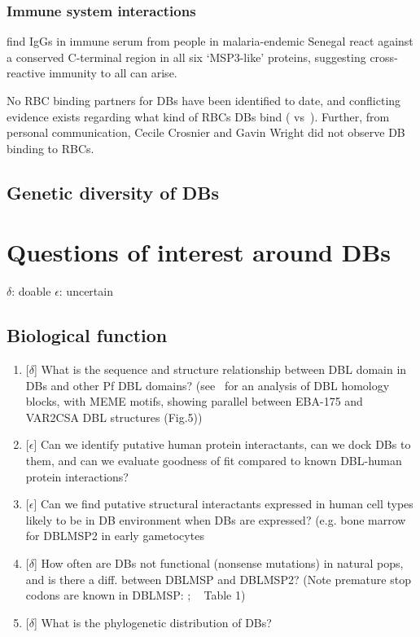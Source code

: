 \documentclass[12pt]{article}
\begin{document}
\subsubsection{Immune system interactions}

\cite{singh_conserved_2009} find IgGs in immune serum from people in malaria-endemic Senegal react against a
conserved C-terminal region in all six `MSP3-like' proteins, suggesting cross-reactive immunity to
all can arise.

No RBC binding partners for DBs have been identified to date, and conflicting evidence
exists regarding what kind of RBCs DBs bind (\cite{wickramarachchi_novel_2009} vs~\cite{Hodder2012}).
Further, from personal communication, Cecile Crosnier and Gavin Wright did not observe DB binding
to RBCs.

\subsection{Genetic diversity of DBs}


\clearpage

\section{Questions of interest around DBs}
$\delta$: doable
$\epsilon$: uncertain

\subsection{Biological function}
\begin{enumerate}
    \item{[$\delta$] What is the sequence and structure relationship between DBL domain in DBs and other Pf DBL domains?
        (see~\cite{Rask2010} for an analysis of DBL homology blocks, with MEME motifs,
        showing parallel between EBA-175 and VAR2CSA DBL structures (Fig.5))
        }
    \item{[$\epsilon$] Can we identify putative human protein interactants, can we dock
        DBs to them, and can we evaluate goodness of fit compared to known DBL-human
        protein interactions?}
    \item{[$\epsilon$] Can we find putative structural interactants expressed in human
        cell types likely to be in DB environment when DBs are expressed? (e.g. bone
        marrow for DBLMSP2 in early gametocytes}
    \item{[$\delta$] How often are DBs not functional (nonsense mutations) in natural
        pops, and is there a diff. between DBLMSP and DBLMSP2? (Note 
        premature stop codons are known in DBLMSP: \cite{Tetteh2009};
        ~\cite{ochola_allele_2010} Table 1)}
    \item{[$\delta$] What is the phylogenetic distribution of DBs?
        }
\end{enumerate}
\end{document}
